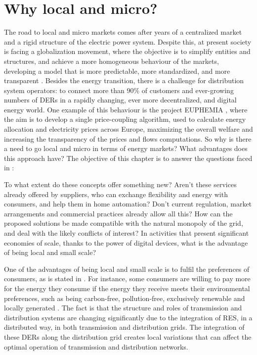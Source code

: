 \section{Why local and micro?} \label{sec:why}
The road to local and micro markets comes after years of a centralized market and a rigid structure of the electric power system. Despite this, at present society is facing a globalization movement, where the objective is to simplify entities and structures, and achieve a more homogeneous behaviour of the markets, developing a model that is more predictable, more standardized, and more transparent \cite{Mallet2014}. Besides the energy transition, there is a challenge for distribution system operators: to connect more than 90\% of customers and ever-growing numbers of DERs in a rapidly changing, ever more decentralized, and digital energy world. One
example of this behaviour is the project EUPHEMIA \cite{EUPHEMIA2016}, where the aim is to develop a single price-coupling algorithm, used to calculate energy allocation and electricity prices across Europe, maximizing the overall welfare and increasing the transparency of the prices and flows computations. So why is there a need to go local and micro in terms of energy markets? What advantages does this approach have? The objective of this chapter is to answer the questions faced in \cite{DesignElectricityMarketRossetoo2017}:

\begin{tcolorbox}
To what extent do these concepts offer something new? Aren't these services already offered by suppliers, who can exchange flexibility and energy with consumers, and help them in home automation? Don't current regulation, market arrangements and commercial
practices already allow all this? How can the proposed solutions be made compatible with the natural monopoly of the grid, and deal with the likely conflicts of interest? In activities that present significant economies of scale, thanks to the power of digital devices, what is the advantage of being local and small scale?
\end{tcolorbox}

One of the advantages of being local and small scale is to fulfil the preferences of consumers, as is stated in \cite{faber2014micro}. For instance, some consumers are willing to pay more for the energy they consume if the energy they receive meets their environmental preferences, such as being carbon-free, pollution-free, exclusively renewable and locally generated \cite{lane2013costing}. The fact is that the structure and roles of transmission and distribution systems are changing significantly due to the integration of RES, in a distributed way, in both transmission and distribution grids. The integration of these DERs along the distribution grid creates local variations that can affect the optimal operation of transmission and distribution networks.

